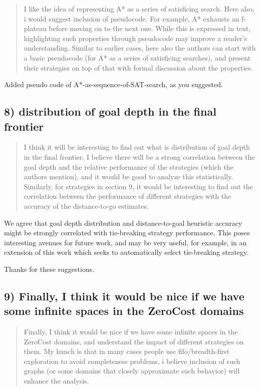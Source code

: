 \documentclass{article}
\begin{document}
\begin{quote}
 I like the idea of representing A* as a series of satisficing
search. Here also, i would suggest inclusion of pseudocode. For
example, A* exhausts an f-plateau before moving on to the next one.
While this is expressed in text, highlighting such properties through
pseudocode may improve a reader's understanding. Similar to earlier
cases, here also the authors can start with a basic pseudocode (for A*
as a series of satisficing searches), and present their strategies on
top of that with formal discussion about the properties.
\end{quote}

Added pseudo code of A*-as-sequence-of-SAT-search, as you suggested.

\subsection{8) distribution of goal depth in the final frontier}
\label{sec:orgheadline22}

\begin{quote}
 I think it will be interesting to find out what is distribution of
goal depth in the final frontier. I believe there will be a strong
correlation between the goal depth and the relative performance of the
strategies (which the authors mention), and it would be good to
analyze this statistically. Similarly, for strategies in section 9, it
would be interesting to find out the correlation between the
performance of different strategies with the accuracy of the
distance-to-go estimates.
\end{quote}

We agree that goal depth distribution
and distance-to-goal heuristic accuracy might be strongly correlated with tie-breaking strategy performance.
This poses interesting avenues for future work, 
and may be very useful, for example, in an extension of this work which 
seeks to automatically select tie-breaking strategy.  

Thanks for these suggestions. 


\subsection{9) Finally, I think it would be nice if we have some infinite spaces in the ZeroCost domains}
\label{sec:orgheadline23}

\begin{quote}
 Finally, I think it would be nice if we have some infinite spaces
in the ZeroCost domains, and understand the impact of different
strategies on them. My hunch is that in many cases people use
fifo/breadth-first exploration to avoid completeness problems, i
believe inclusion of such graphs (or some domains that closely
approximate such behavior) will enhance the analysis.
\end{quote}
\end{document}

